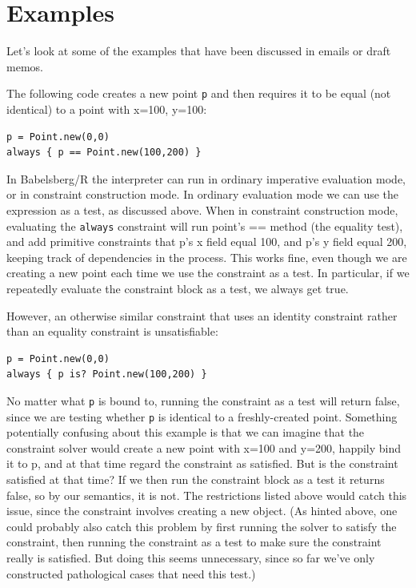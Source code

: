 \documentclass{article}
\begin{document}
\section{Examples}
\label{sec:examples}

Let's look at some of the examples that have been discussed in emails
or draft memos.

The following code creates a new point \verb|p| and then requires it
to be equal (not identical) to a point with x=100, y=100:

\begin{verbatim}
p = Point.new(0,0)
always { p == Point.new(100,200) }
\end{verbatim}

In Babelsberg/R the interpreter can run in ordinary imperative
evaluation mode, or in constraint construction mode.  In ordinary
evaluation mode we can use the expression as a test, as discussed
above.  When in constraint construction mode, evaluating the
\verb|always| constraint will run point's == method (the equality
test), and add primitive constraints that p's x field equal 100, and
p's y field equal 200, keeping track of dependencies in the process.
This works fine, even though we are creating a new point each time we
use the constraint as a test.  In particular, if we repeatedly
evaluate the constraint block as a test, we always get true.

However, an otherwise similar constraint that uses an identity
constraint rather than an equality constraint is unsatisfiable:

\begin{verbatim}
p = Point.new(0,0)
always { p is? Point.new(100,200) }
\end{verbatim}

No matter what \verb|p| is bound to, running the constraint as a test
will return false, since we are testing whether \verb|p| is identical
to a freshly-created point.  Something potentially confusing about
this example is that we can imagine that the constraint solver would
create a new point with x=100 and y=200, happily bind it to p, and at
that time regard the constraint as satisfied.  But is the constraint
satisfied at that time?  If we then run the constraint block as a test
it returns false, so by our semantics, it is not.  The restrictions
listed above would catch this issue, since the constraint involves
creating a new object.  (As hinted above, one could probably also
catch this problem by first running the solver to satisfy the
constraint, then running the constraint as a test to make sure the
constraint really is satisfied.  But doing this seems unnecessary,
since so far we've only constructed pathological cases that need this
test.)
\end{document}

